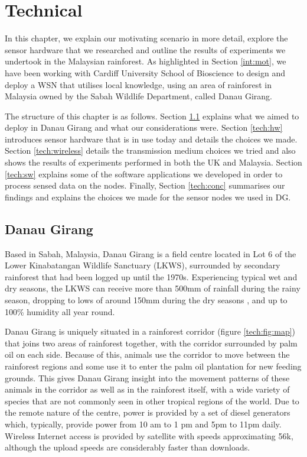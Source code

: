 \chapter{Technical}\label{chap:technical}
	In this chapter, we explain our motivating scenario in more detail, explore the sensor hardware that we researched and outline the results of experiments we undertook in the Malaysian rainforest. As highlighted in Section \ref{int:mot}, we have been working with Cardiff University School of Bioscience to design and deploy a WSN that utilises local knowledge, using an area of rainforest in Malaysia owned by the Sabah Wildlife Department, called Danau Girang.

The structure of this chapter is as follows. Section \ref{tech:motiv} explains what we aimed to deploy in Danau Girang and what our considerations were. Section \ref{tech:hw} introduces sensor hardware that is in use today and details the choices we made. Section \ref{tech:wireless} details the transmission medium choices we tried and also shows the results of experiments performed in both the UK and Malaysia. Section \ref{tech:sw} explains some of the software applications we developed in order to process sensed data on the nodes. Finally, Section \ref{tech:conc} summarises our findings and explains the choices we made for the sensor nodes we used in DG. 

\section{Danau Girang}\label{tech:motiv}
Based in Sabah, Malaysia, Danau Girang is a field centre located in Lot 6 of the Lower Kinabatangan Wildlife Sanctuary (LKWS), surrounded by secondary rainforest that had been logged up until the 1970s. Experiencing typical wet and dry seasons, the LKWS can receive more than 500mm of rainfall during the rainy season, dropping to lows of around 150mm during the dry seasons \cite{Walsh2009}, and up to 100\% humidity all year round. 

Danau Girang is uniquely situated in a rainforest corridor (figure \ref{tech:fig:map}) that joins two areas of rainforest together, with the corridor surrounded by palm oil on each side. Because of this, animals use the corridor to move between the rainforest regions and some use it to enter the palm oil plantation for new feeding grounds. This gives Danau Girang insight into the movement patterns of these animals in the corridor as well as in the rainforest itself, with a wide variety of species that are not commonly seen in other tropical regions of the world. Due to the remote nature of the centre, power is provided by a set of diesel generators which, typically, provide power from 10 am to 1 pm and 5pm to 11pm daily. Wireless Internet access is provided by satellite with speeds approximating 56k, although the upload speeds are considerably faster than downloads.


